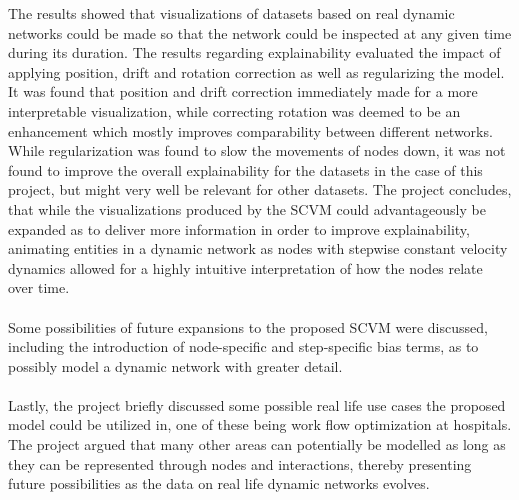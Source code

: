 The results showed that visualizations of datasets based on real dynamic networks could be made so that the network could be inspected at any given time during its duration.
The results regarding explainability evaluated the impact of applying position, drift and rotation correction as well as regularizing the model.
It was found that position and drift correction immediately made for a more interpretable visualization, while correcting rotation was deemed to be an enhancement which mostly improves comparability between different networks.
While regularization was found to slow the movements of nodes down, it was not found to improve the overall explainability for the datasets in the case of this project, but might very well be relevant for other datasets.
The project concludes, that while the visualizations produced by the SCVM could advantageously be expanded as to deliver more information in order to improve explainability, animating entities in a dynamic network as nodes with stepwise constant velocity dynamics allowed for a highly intuitive interpretation of how the nodes relate over time. 
\\\\
Some possibilities of future expansions to the proposed SCVM were discussed, including the introduction of node-specific and step-specific bias terms, as to possibly model a dynamic network with greater detail.
\\\\
Lastly, the project briefly discussed some possible real life use cases the proposed model could be utilized in, one of these being work flow optimization at hospitals. 
The project argued that many other areas can potentially be modelled as long as they can be represented through nodes and interactions, thereby presenting future possibilities as the data on real life dynamic networks evolves. 

